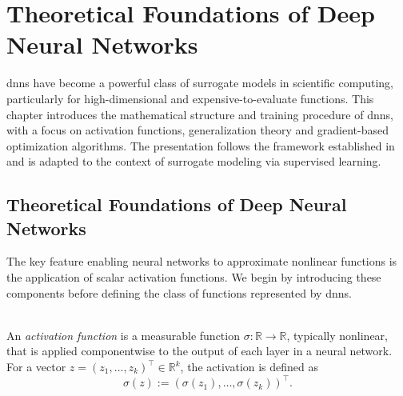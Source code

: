 \chapter{Theoretical Foundations of Deep Neural Networks}
\label{chapter:dnn-theory}

\acfp{dnn} have become a powerful class of surrogate models in scientific
computing, particularly for high-dimensional and expensive-to-evaluate
functions. This chapter introduces the mathematical structure and training
procedure of \acp{dnn}, with a focus on activation functions, generalization
theory and gradient-based optimization algorithms. The presentation follows the
framework established in \cite{mishra2021enhancing} and is adapted to the
context of surrogate modeling via supervised learning.

\section{Theoretical Foundations of Deep Neural Networks}
\label{sec:dnn-definition}

The key feature enabling neural networks to approximate nonlinear functions is
the application of scalar activation functions. We begin by introducing these
components before defining the class of functions represented by \aclp{dnn}.

\begin{definition} \ \\
An \emph{activation function} is a measurable function $\sigma : \mathbb{R} \to
\mathbb{R}$, typically nonlinear, that is applied componentwise to the output of
each layer in a neural network. For a vector $z = (z_1, \dots, z_k)^\top \in
\mathbb{R}^k$, the activation is defined as
\begin{equation*}
    \sigma(z) := (\sigma(z_1), \dots, \sigma(z_k))^\top.
\end{equation*}
\end{definition}

